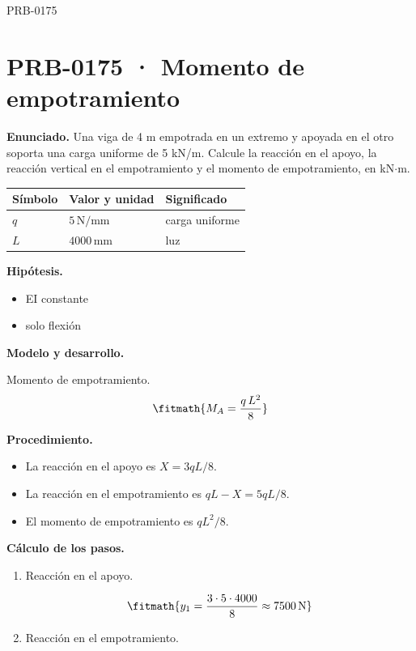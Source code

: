 \begin{studiumworked}{PRB-0175}

\section{PRB-0175 · Momento de empotramiento}

\textbf{Enunciado.} Una viga de 4 m empotrada en un extremo y apoyada en el otro soporta una carga uniforme de 5 kN/m. Calcule la reacción en el apoyo, la reacción vertical en el empotramiento y el momento de empotramiento, en kN$\cdot$m.

\par\medskip\noindent\begin{tabular}{@{}p{.18\linewidth}p{.26\linewidth}p{.48\linewidth}@{}}
\toprule Símbolo & Valor y unidad & Significado\\\midrule
$q$ & $5\,\mathrm{N/mm}$ & carga uniforme\\
$L$ & $4000\,\mathrm{mm}$ & luz\\
\bottomrule\end{tabular}\par\medskip

\textbf{Hipótesis.}\begin{itemize}\item EI constante
\item solo flexión\end{itemize}

\textbf{Modelo y desarrollo.}

Momento de empotramiento.\[\fitmath{M_A = \frac{q\,L^{2}}{8}}\]

\textbf{Procedimiento.}\begin{itemize}\item La reacción en el apoyo es $X = 3qL/8$.
\item La reacción en el empotramiento es $qL - X = 5qL/8$.
\item El momento de empotramiento es $qL^2/8$.\end{itemize}

\textbf{Cálculo de los pasos.}

\begin{enumerate}

\item Reacción en el apoyo.

\[\fitmath{y_{1}=\frac{3\cdot 5\cdot 4000}{8}\approx 7500\,\mathrm{N}}\]

\item Reacción en el empotramiento.


\end{enumerate}
\end{studiumworked}
